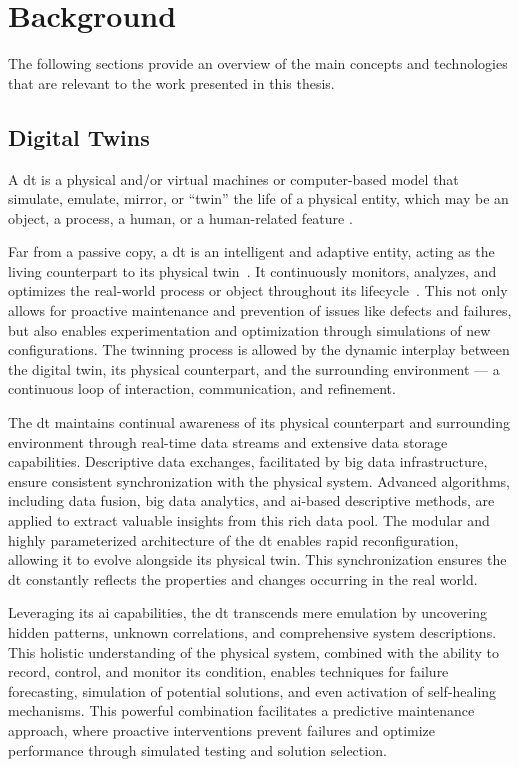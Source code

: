 \chapter{Background}\label{ch:background}

The following sections provide an overview of the main concepts and technologies that are relevant to the work presented in this thesis.

\section{Digital Twins}

A \acrfull{dt} is a physical and/or virtual machines or computer-based model that simulate, emulate, mirror, or ``twin'' the life of a physical entity, which may be an object, a process, a human, or a human-related feature \parencite{barricelliMultiModalApproachCreating2022}.

Far from a passive copy, a \acrshort{dt} is an intelligent and adaptive entity, acting as the living counterpart to its physical twin~\parencite{grievesDigitalTwinManufacturing2015,kritzingerDigitalTwinManufacturing2018}. It continuously monitors, analyzes, and optimizes the real-world process or object throughout its lifecycle~\parencite{negriReviewRolesDigital2017}. This not only allows for proactive maintenance and prevention of issues like defects and failures, but also enables experimentation and optimization through simulations of new configurations. The twinning process is allowed by the dynamic interplay between the digital twin, its physical counterpart, and the surrounding environment --- a continuous loop of interaction, communication, and refinement.

The \acrshort{dt} maintains continual awareness of its physical counterpart and surrounding environment through real-time data streams and extensive data storage capabilities. Descriptive data exchanges, facilitated by big data infrastructure, ensure consistent synchronization with the physical system. Advanced algorithms, including data fusion, big data analytics, and \acrshort{ai}-based descriptive methods, are applied to extract valuable insights from this rich data pool. The modular and highly parameterized architecture of the \acrshort{dt} enables rapid reconfiguration, allowing it to evolve alongside its physical twin. This synchronization ensures the \acrshort{dt} constantly reflects the properties and changes occurring in the real world.

Leveraging its \acrshort{ai} capabilities, the \acrshort{dt} transcends mere emulation by uncovering hidden patterns, unknown correlations, and comprehensive system descriptions. This holistic understanding of the physical system, combined with the ability to record, control, and monitor its condition, enables techniques for failure forecasting, simulation of potential solutions, and even activation of self-healing mechanisms. This powerful combination facilitates a predictive maintenance approach, where proactive interventions prevent failures and optimize performance through simulated testing and solution selection.

